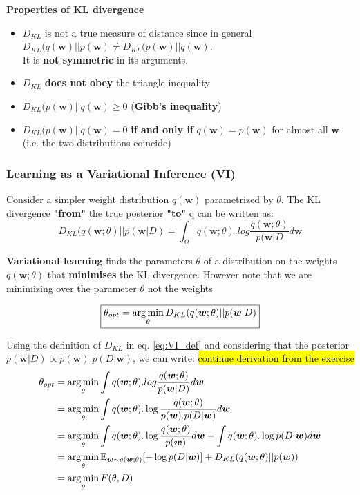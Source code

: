 \documentclass[main]{subfiles}
\begin{document}
\textbf{Properties of KL divergence}
\begin{itemize}
    \item $D_{KL}$ is not a true measure of distance since in general \\ $D_{KL}(q(\bm{w})||p(\bm{w}) \neq D_{KL}(p(\bm{w})||q(\bm{w})$.\\ It is \textbf{not symmetric} in its arguments.
    \item $D_{KL}$ \textbf{does not obey} the triangle inequality
    \item $D_{KL}(p(\bm{w})||q(\bm{w}) \geq{0}$ (\textbf{Gibb's inequality})
    \item $D_{KL}(p(\bm{w})||q(\bm{w})={0}$ \textbf{if and only if} $q(\bm{w}) = p(\bm{w})$ for almost all $\bm{w}$ (i.e. the two distributions coincide)
\end{itemize}

\subsubsection{Learning as a Variational Inference (VI)}
Consider a simpler weight distribution $q(\bm{w})$ parametrized by $\theta$. The KL divergence \textbf{"from"} the true posterior\textbf{ "to" }q can be written as:
\begin{equation}
    D_{KL}(q(\bm{w}; \theta)||p(\bm{w} |D) = \int_\Omega q(\bm{w};\theta) . log \frac{q(\bm{w};\theta)}{p(\bm{w}|D} d\bm{w}
\end{equation}

\noindent
\textbf{Variational learning} finds the parameters $\theta$ of a distribution on the weights $q(\bm{w};\theta)$ that \textbf{minimises} the KL divergence. However note that we are minimizing over the parameter $\theta$ not the weights


\begin{equation}
\boxed{
    \theta_{opt} = \operatorname*{arg\,min}_\theta D_{KL}(q(\bm{w}; \theta)||p(\bm{w} |D)
    }
    \label{eq:VI_def}
\end{equation}

Using the definition of $D_{KL}$ in eq. \ref{eq:VI_def} and considering that the posterior $p(\bm{w}|D) \propto p(\bm{w}). p(D|\bm{w})$, we can write: \hl{continue derivation from the exercise}
\begin{equation}
    \begin{split}
        \theta_{opt} &= \operatorname*{arg\,min}_\theta \int q(\bm{w};\theta) . log \frac{q(\bm{w};\theta)}{p(\bm{w}|D)} d\bm{w}\\
        &= \operatorname*{arg\,min}_\theta \int q(\bm{w};\theta) . \log \frac{q(\bm{w};\theta)}{p(\bm{w}). p(D|\bm{w})} d\bm{w}\\
        &= \operatorname*{arg\,min}_\theta \int q(\bm{w};\theta). \log \frac{q(\bm{w};\theta)}{p(\bm{w})}  d\bm{w} - \int q(\bm{w};\theta).\log p(D|\bm{w})d\bm{w}\\
        &= \operatorname*{arg\,min}_\theta \operatorname{\mathbb{E}}_{\bm{w} \sim q(\bm{w};\theta)} [-\log p(D|\bm{w})] + D_{KL}(q(\bm{w}; \theta)||p(\bm{w}))\\
        &= \operatorname*{arg\,min}_\theta F(\theta, D)
    \end{split}
    \label{eq:VI_opt}
\end{equation}
\end{document}
